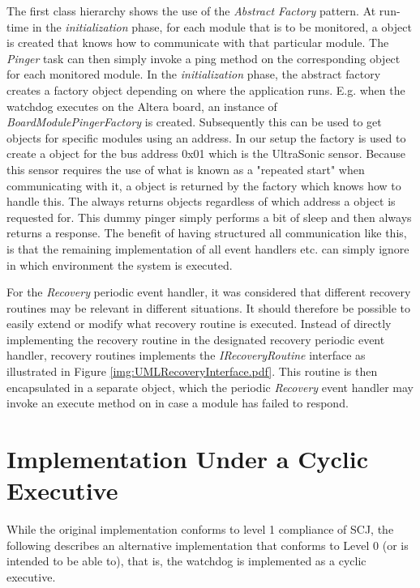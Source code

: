 The first class hierarchy shows the use of the \textit{Abstract Factory} pattern. At run-time in the \textit{initialization} phase, for each module that is to be monitored, a  object is created that knows how to communicate with that particular module. The \textit{Pinger} task can then simply invoke a ping method on the corresponding  object for each monitored module. In the \textit{initialization} phase, the abstract factory creates a factory object depending on where the application runs. E.g. when the watchdog executes on the Altera board, an instance of \emph{BoardModulePingerFactory} is created. Subsequently this can be used to get  objects for specific modules using an \iic address. In our setup the factory is used to create a  object for the \iic bus address 0x01 which is the UltraSonic sensor. Because this sensor requires the use of what is known as a "repeated start" when communicating with it, a  object is returned by the factory which knows how to handle this.
The  always returns   objects regardless of which \iic address a  object is requested for. This dummy pinger simply performs a bit of sleep and then always returns a response. The benefit of having structured all communication like this, is that the remaining implementation of all event handlers etc. can simply ignore in which environment the system is executed.

For the \textit{Recovery} periodic event handler, it was considered that different recovery routines may be relevant in different situations. It should therefore be possible to easily extend or modify what recovery routine is executed. Instead of directly implementing the recovery routine in the designated recovery periodic event handler, recovery routines implements the \emph{IRecoveryRoutine} interface as illustrated in Figure \ref{img:UMLRecoveryInterface.pdf}. This routine is then encapsulated in a separate object, which the periodic \textit{Recovery} event handler may invoke an execute method on in case a module has failed to respond.


\section{Implementation Under a Cyclic Executive} %
\label{sec:implementing_the_watchdog_as_a_cyclic_executive}
While the original implementation conforms to level 1 compliance of SCJ, the following describes an alternative implementation that conforms to Level 0 (or is intended to be able to), that is, the watchdog is implemented as a cyclic executive.

